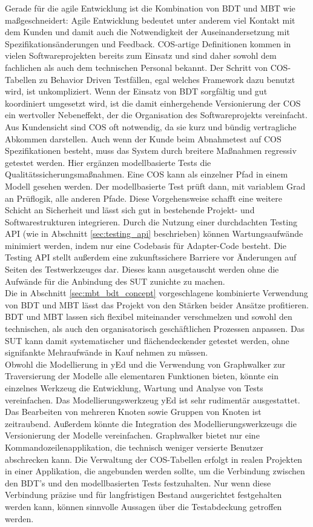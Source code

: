 Gerade für die agile Entwicklung ist die Kombination von \Gls{BDT} und \Gls{MBT} wie maßgeschneidert: Agile Entwicklung bedeutet unter anderem viel Kontakt mit dem Kunden und damit auch die Notwendigkeit der Auseinandersetzung mit Spezifikationsänderungen und Feedback. \Gls{COS}-artige Definitionen kommen in vielen Softwareprojekten bereits zum Einsatz und sind daher sowohl dem fachlichen als auch dem technischen Personal bekannt. Der Schritt von \Gls{COS}-Tabellen zu Behavior Driven Testfällen, egal welches Framework dazu benutzt wird, ist unkompliziert. Wenn der Einsatz von \Gls{BDT} sorgfältig und gut koordiniert umgesetzt wird, ist die damit einhergehende Versionierung der \Gls{COS} ein wertvoller Nebeneffekt, der die Organisation des Softwareprojekts vereinfacht. Aus Kundensicht sind \Gls{COS} oft notwendig, da sie kurz und bündig vertragliche Abkommen darstellen. Auch wenn der Kunde beim Abnahmetest auf \Gls{COS} Spezifikationen besteht, muss das System durch breitere Maßnahmen regressiv getestet werden. Hier ergänzen modellbasierte Tests die Qualitätssicherungsmaßnahmen. Eine \Gls{COS} kann als einzelner Pfad in einem Modell gesehen werden. Der modellbasierte Test prüft dann, mit variablem Grad an Prüflogik, alle anderen Pfade. Diese Vorgehensweise schafft eine weitere Schicht an Sicherheit und lässt sich gut in bestehende Projekt- und Softwarestrukturen integrieren. Durch die Nutzung einer durchdachten Testing API (wie in Abschnitt \ref{sec:testing_api} beschrieben) können Wartungsaufwände minimiert werden, indem nur eine Codebasis für Adapter-Code besteht. Die Testing API stellt außerdem eine zukunftssichere Barriere vor Änderungen auf Seiten des Testwerkzeuges dar. Dieses kann ausgetauscht werden ohne die Aufwände für die Anbindung des \Gls{SUT} zunichte zu machen.\\
Die in Abschnitt \ref{sec:mbt_bdt_concept} vorgeschlagene kombinierte Verwendung von \Gls{BDT} und \Gls{MBT} lässt das Projekt von den Stärken beider Ansätze profitieren. \Gls{BDT} und \Gls{MBT} lassen sich flexibel miteinander verschmelzen und sowohl den technischen, als auch den organisatorisch geschäftlichen Prozessen anpassen. Das \Gls{SUT} kann damit systematischer und flächendeckender getestet werden, ohne signifankte Mehraufwände in Kauf nehmen zu müssen.\\
Obwohl die Modellierung in yEd und die Verwendung von Graphwalker zur Traversierung der Modelle alle elementaren Funktionen bieten, könnte ein einzelnes Werkzeug die Entwicklung, Wartung und Analyse von Tests vereinfachen. Das Modellierungswerkzeug yEd ist sehr rudimentär ausgestattet. Das Bearbeiten von mehreren Knoten sowie Gruppen von Knoten ist zeitraubend. Außerdem könnte die Integration des Modellierungswerkzeugs die Versionierung der Modelle vereinfachen. Graphwalker bietet nur eine Kommandozeilenapplikation, die technisch weniger versierte Benutzer abschrecken kann. Die Verwaltung der \Gls{COS}-Tabellen erfolgt in realen Projekten in einer Applikation, die angebunden werden sollte, um die Verbindung zwischen den \Gls{BDT}'s und den modellbasierten Tests festzuhalten. Nur wenn diese Verbindung präzise und für langfristigen Bestand ausgerichtet festgehalten werden kann, können sinnvolle Aussagen über die Testabdeckung getroffen werden. 